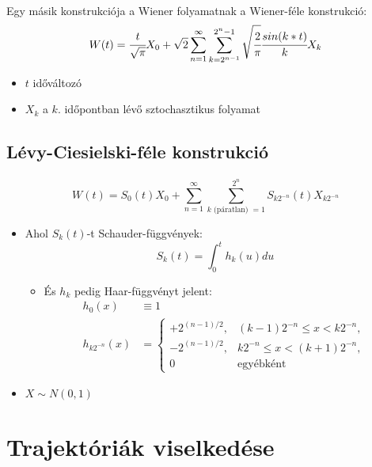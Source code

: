 \documentclass[11pt,a4pape,draftr]{article}
\begin{document}
					\paragraph{}
						Egy másik konstrukciója a Wiener folyamatnak a Wiener-féle konstrukció:
						$$W(t) = \cfrac{t}{\sqrt{\pi}} X_0 + \sqrt{2} \sum_{n=1}^\infty \sum_{k = 2^{n-1}}^{2^n-1}\sqrt{\cfrac{2}{\pi}}\cfrac{sin(k*t)}{k} X_k$$
						\begin{itemize}
							\item $t$ időváltozó
							\item $X_k$ a $k.$ időpontban lévő sztochasztikus folyamat
						\end{itemize}
				\subsection{Lévy-Ciesielski-féle konstrukció}
					\paragraph{}
						$$W(t) = S_0(t)X_0 + \sum_{n=1}^{\infty} \sum_{k \text{ (páratlan) }=1 }^{2^{n}}S_{k2^{-n}}(t)X_{k2^{-n}}$$
						\begin{itemize}
							  \item Ahol $S_k(t)$-t Schauder-függvények:
							  $$S_k(t) = \int_{0}^t h_k(u)du$$
							    \begin{itemize}
							      \item És $h_k$ pedig Haar-függvényt jelent:
							      $$\begin{aligned}
							         h_0(x) & \equiv 1 \\
							         h_{k 2^{-n}}(x) & = \begin{cases}
							             +2^{(n-1)/2}, & (k-1)2^{-n} \le x < k2^{-n}, \\
							             -2^{(n-1)/2}, & k2^{-n} \le x < (k+1)2^{-n}, \\
							             0 & \text{egyébként}
							         \end{cases}
							       \end{aligned}$$
							    \end{itemize}
							  \item $X \sim N(0,1)$
						\end{itemize}	
			\section[Wiener-folyamat trajektóriáinak viselkedése]{Trajektóriák viselkedése}
\end{document}
